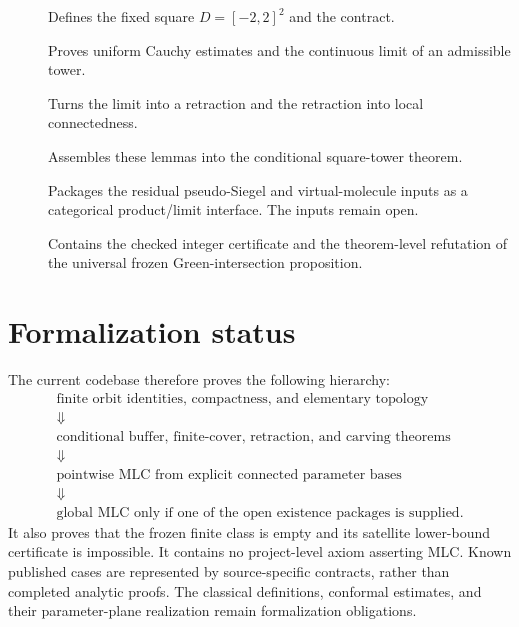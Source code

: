 \begin{description}
\item[]
Defines the fixed square $D=[-2,2]^2$ and the
 contract.

\item[]
Proves uniform Cauchy estimates and the continuous limit of an admissible
tower.

\item[]
Turns the limit into a retraction and the retraction into local
connectedness.

\item[]
Assembles these lemmas into the conditional square-tower theorem.

\item[]
Packages the residual pseudo-Siegel and virtual-molecule inputs as a
categorical product/limit interface.  The inputs remain open.

\item[]
Contains the checked integer certificate and the theorem-level refutation
of the universal frozen Green-intersection proposition.
\end{description}

\section*{Formalization status}

The current codebase therefore proves the following hierarchy:
\[
\begin{gathered}
\text{finite orbit identities, compactness, and elementary topology}\\
\Downarrow\\
\text{conditional buffer, finite-cover, retraction, and carving theorems}\\
\Downarrow\\
\text{pointwise MLC from explicit connected parameter bases}\\
\Downarrow\\
\text{global MLC only if one of the open existence packages is supplied}.
\end{gathered}
\]
It also proves that the frozen finite class is empty and its satellite
lower-bound certificate is impossible.  It contains no project-level
axiom asserting MLC.  Known published cases are represented by
source-specific contracts, rather than completed analytic proofs.
The classical definitions, conformal estimates, and their
parameter-plane realization remain formalization obligations.
\par\endgroup
